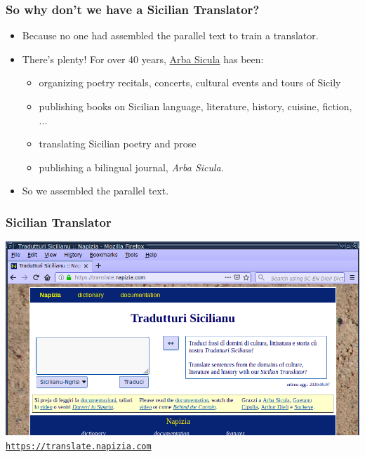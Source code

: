 \documentclass{beamer}
\begin{document}

\begin{frame}
  \frametitle{So why don't we have a Sicilian Translator?}
  \vspace{-1.0em}
  \begin{itemize}
  \item Because no one had assembled the parallel text to train a translator.
    \vspace{1em}
    \item There's plenty!  For over 40 years, \href{http://www.arbasicula.org/}{Arba Sicula} has been:
    \begin{itemize}
    \item organizing poetry recitals, concerts, cultural events and tours of Sicily
    \item publishing books on Sicilian language, literature, history, cuisine, fiction, ...
    \item translating Sicilian poetry and prose
    \item publishing a bilingual journal, \textit{Arba Sicula}.
    \end{itemize}
  \vspace{1em}
  \item So we assembled the parallel text.
  \end{itemize} 
\end{frame}


\begin{frame}
  \frametitle{Sicilian Translator}
  \vspace{-1.0em}
  \href{https://translate.napizia.com}{%
    \includegraphics[width=\textwidth]{images/browser-white-box_v1.png}
  }
  \vspace{-1.0em}
  \hspace{-7.0pt}
  \footnotesize{\href{https://translate.napizia.com}{\texttt{https://translate.napizia.com}}}
\end{frame}
\end{document}
